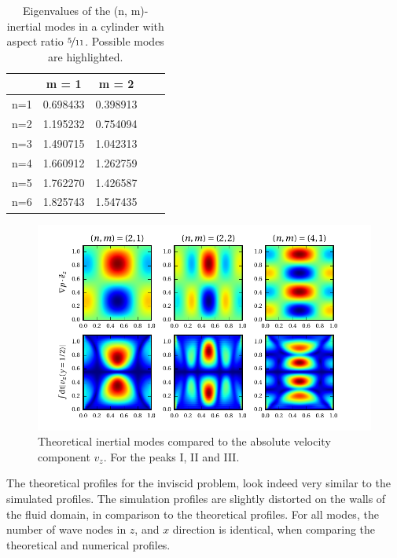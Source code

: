 \bgroup\large
\begin{table}[!b]
\centering
\def\arraystretch{1.5}%
\begin{tabular}{c c c c c}\toprule
            &    m =  1  & m = 2   &    \\ \hline
\midrule
        n=1 &   0.698433         &              0.398913 &    \\
        n=2 & \cellcolor{blue!25}  1.195232         &        \cellcolor{blue!25}      0.754094 &    \\
        n=3 &   1.490715         &              1.042313 &    \\
        n=4 &  \cellcolor{blue!25} 1.660912         &     \cellcolor{blue!25}         1.262759 &    \\
        n=5 &   1.762270         &              1.426587 &    \\
        n=6 &   1.825743         &              1.547435 &    \\ \hline

\bottomrule
\end{tabular}
\caption{Eigenvalues of the (n, m)-inertial modes in a cylinder with aspect ratio $\nicefrac{5}{11}$.
            Possible modes are highlighted.  \label{cone_cyleigenvalues} }
\end{table}
\egroup
\clearpage


\begin{figure}[!t]
  \centering
  \includegraphics{gfx/cone/cylinder/modes.pdf}  \caption{
      Theoretical inertial modes compared to the absolute velocity component $v_z$.
      For the peaks \RN{1}, \RN{2} and \RN{3}.
      \label{cone:cyl_modes}}
\end{figure}

The theoretical profiles for the inviscid problem, look indeed very similar to the simulated profiles.
The simulation profiles are slightly distorted on the walls of the fluid domain, in
comparison to the theoretical profiles.
For all modes, the number of wave nodes in $z$, and $x$ direction is identical,
 when comparing the theoretical and numerical profiles.

